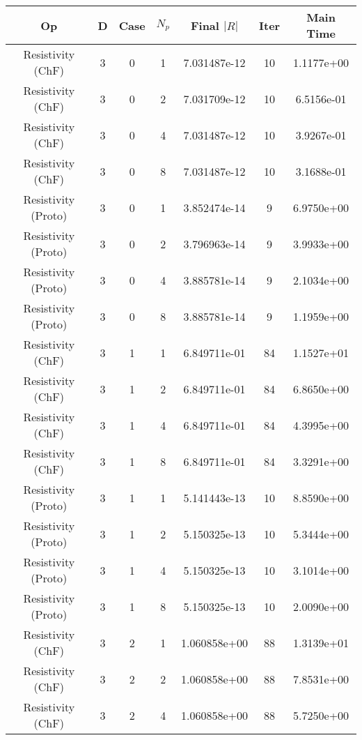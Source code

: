 \documentclass{article}
\begin{document}
\begin{small} 
  \begin{table} 
    \begin{center}
      \begin{tabular}{|c|c|c|c|c|c||c|} \hline 
Op & D & Case & $N_p$ & Final $|R|$  &  Iter & Main Time \\  
        \hline 
        Resistivity      (ChF) & 3 & 0 & 1& 7.031487e-12 & 10 & 1.1177e+00\\
        Resistivity      (ChF) & 3 & 0 & 2& 7.031709e-12 & 10 & 6.5156e-01\\
        Resistivity      (ChF) & 3 & 0 & 4& 7.031487e-12 & 10 & 3.9267e-01\\
        Resistivity      (ChF) & 3 & 0 & 8& 7.031487e-12 & 10 & 3.1688e-01\\
        Resistivity    (Proto) & 3 & 0 & 1& 3.852474e-14 & 9 & 6.9750e+00\\
        Resistivity    (Proto) & 3 & 0 & 2& 3.796963e-14 & 9 & 3.9933e+00\\
        Resistivity    (Proto) & 3 & 0 & 4& 3.885781e-14 & 9 & 2.1034e+00\\
        Resistivity    (Proto) & 3 & 0 & 8& 3.885781e-14 & 9 & 1.1959e+00\\
        \hline 
        Resistivity      (ChF) & 3 & 1 & 1& 6.849711e-01 & 84 & 1.1527e+01\\
        Resistivity      (ChF) & 3 & 1 & 2& 6.849711e-01 & 84 & 6.8650e+00\\
        Resistivity      (ChF) & 3 & 1 & 4& 6.849711e-01 & 84 & 4.3995e+00\\
        Resistivity      (ChF) & 3 & 1 & 8& 6.849711e-01 & 84 & 3.3291e+00\\
        Resistivity    (Proto) & 3 & 1 & 1& 5.141443e-13 & 10 & 8.8590e+00\\
        Resistivity    (Proto) & 3 & 1 & 2& 5.150325e-13 & 10 & 5.3444e+00\\
        Resistivity    (Proto) & 3 & 1 & 4& 5.150325e-13 & 10 & 3.1014e+00\\
        Resistivity    (Proto) & 3 & 1 & 8& 5.150325e-13 & 10 & 2.0090e+00\\
        \hline 
        Resistivity      (ChF) & 3 & 2 & 1& 1.060858e+00 & 88 & 1.3139e+01\\
        Resistivity      (ChF) & 3 & 2 & 2& 1.060858e+00 & 88 & 7.8531e+00\\
        Resistivity      (ChF) & 3 & 2 & 4& 1.060858e+00 & 88 & 5.7250e+00\\

\end{tabular}
\end{center}
\end{table}
\end{small}
\end{document}
